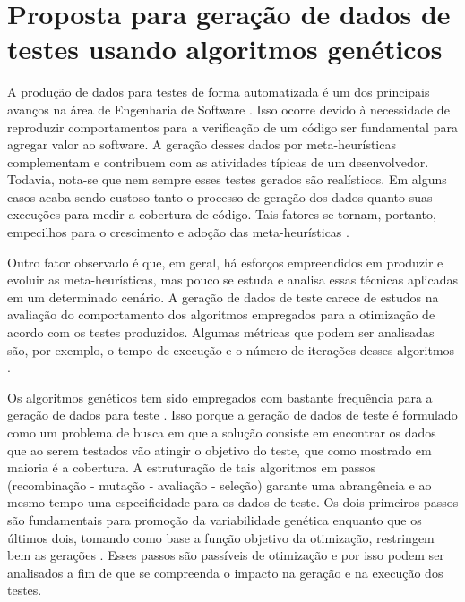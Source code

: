 \chapter[Proposta para geração de dados de testes usando algoritmos
genéticos]{Proposta para geração de dados de testes usando algoritmos genéticos}
\label{propostaestudo}

A produção de dados para testes de forma automatizada é um dos principais avanços na área de Engenharia de Software \cite{harman2015achievements}. Isso ocorre devido à necessidade de reproduzir comportamentos para a verificação de um código ser fundamental para agregar valor ao software. A geração desses dados por meta-heurísticas complementam e contribuem com as atividades típicas de um desenvolvedor. Todavia, nota-se que nem sempre esses testes gerados são realísticos. Em alguns casos acaba sendo custoso tanto o processo de geração dos dados quanto suas execuções para medir a cobertura de código.  Tais fatores se tornam, portanto, empecilhos para o crescimento e adoção das meta-heurísticas \cite{harman2015achievements}.

Outro fator observado é que, em geral, há esforços empreendidos em produzir e evoluir as meta-heurísticas, mas pouco se estuda e analisa essas técnicas aplicadas em um determinado cenário. A geração de dados de teste carece de estudos na avaliação do comportamento dos algoritmos empregados para a otimização de acordo com os testes produzidos. Algumas métricas que podem ser analisadas são, por exemplo, o tempo de execução e o número de iterações desses algoritmos \cite{rodrigues2018using}. 

Os algoritmos genéticos tem sido empregados com bastante frequência para a geração de dados para teste \cite{rodrigues2018using}. Isso porque a geração de dados de teste é formulado como um problema de busca em que a solução consiste em encontrar os dados que ao serem testados vão atingir o objetivo do teste, que como mostrado em maioria é a cobertura. A estruturação de tais algoritmos em passos (recombinação - mutação - avaliação - seleção) garante uma abrangência e ao mesmo tempo uma especificidade para os dados de teste. Os dois primeiros passos são fundamentais para promoção da variabilidade genética enquanto que os últimos dois, tomando como base a função objetivo da otimização, restringem bem as gerações \cite{rodrigues2018using}. Esses passos são passíveis de otimização e por isso podem ser analisados a fim de que se compreenda o impacto na geração e na execução dos testes.


